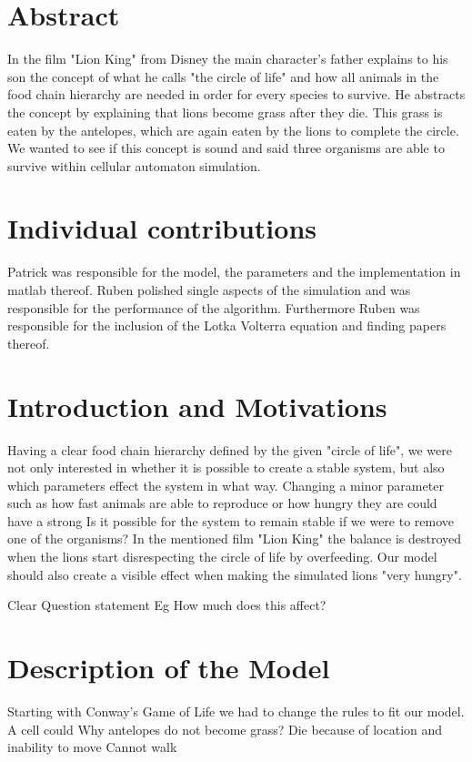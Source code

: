 \documentclass[11pt]{article}
\begin{document}
\section{Abstract}
In the film "Lion King" from Disney the main character's father explains to his son the concept of what he calls "the circle of life" and how all animals in the food chain hierarchy are needed in order for every species to survive. He abstracts the concept by explaining that lions become grass after they die. This grass is eaten by the antelopes, which are again eaten by the lions to complete the circle. We wanted to see if this concept is sound and said three organisms are able to survive within cellular automaton simulation.

\section{Individual contributions}
Patrick was responsible for the model, the parameters and the implementation in matlab thereof. Ruben polished single aspects of the simulation and was responsible for the performance of the algorithm. Furthermore Ruben was responsible for the inclusion of the Lotka Volterra equation and finding papers thereof.

\section{Introduction and Motivations}
Having a clear food chain hierarchy defined by the given "circle of life", we were not only interested in whether it is possible to create a stable system, but also which parameters effect the system in what way. Changing a minor parameter such as how fast animals are able to reproduce or how hungry they are could have a strong Is it possible for the system to remain stable if we were to remove one of the organisms? In the mentioned film "Lion King" the balance is destroyed when the lions start disrespecting the circle of life by overfeeding. Our model should also create a visible effect when making the simulated lions "very hungry".

Clear Question statement
Eg How much does this affect?

\section{Description of the Model}
Starting with Conway's Game of Life \cite{gameOfLife} we had to change the rules to fit our model. A cell could
Why antelopes do not become grass?
Die because of location and inability to move
Cannot walk
\end{document}
